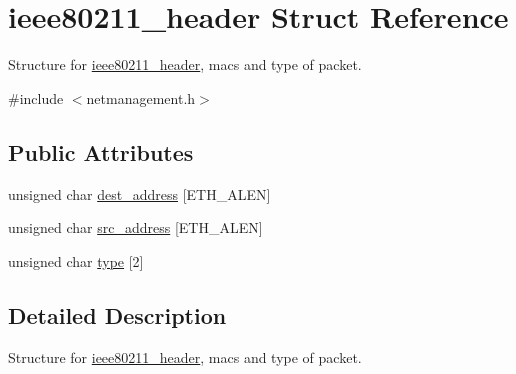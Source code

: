 \hypertarget{structieee80211__header}{\section{ieee80211\-\_\-header \-Struct \-Reference}
\label{structieee80211__header}
}


\-Structure for \hyperlink{structieee80211__header}{ieee80211\-\_\-header}, macs and type of packet.  




{\ttfamily \#include $<$netmanagement.\-h$>$}

\subsection*{\-Public \-Attributes}
\begin{DoxyCompactItemize}
\item 
unsigned char \hyperlink{structieee80211__header_a91878c441326510f5ca457aacef134a5}{dest\-\_\-address} \mbox{[}\-E\-T\-H\-\_\-\-A\-L\-E\-N\mbox{]}
\item 
unsigned char \hyperlink{structieee80211__header_a0be34f3634a371c30b184944b6eddfb5}{src\-\_\-address} \mbox{[}\-E\-T\-H\-\_\-\-A\-L\-E\-N\mbox{]}
\item 
unsigned char \hyperlink{structieee80211__header_a09ecb123ea64ba2684d551be44ba1eb3}{type} \mbox{[}2\mbox{]}
\end{DoxyCompactItemize}


\subsection{\-Detailed \-Description}
\-Structure for \hyperlink{structieee80211__header}{ieee80211\-\_\-header}, macs and type of packet. 

